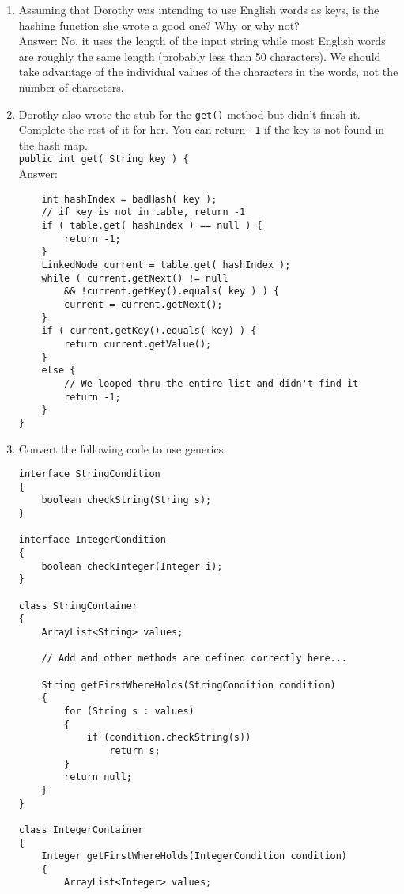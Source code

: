 \documentclass[11pt]{article}
\newenvironment{answer}{\large\lstset{basicstyle=\large\ttfamily}\color{white} \small{Answer:}}{}
\newenvironment{answer}{\large\lstset{basicstyle=\large\ttfamily}\color{red} \small{Answer:}}{}
\begin{document}
\begin{enumerate}
\item Assuming that Dorothy was intending to use English words as keys, is the hashing function she wrote a good one? Why or why not? \\
\begin{answer}
No, it uses the length of the input string while most English words are roughly the same length (probably less than 50 characters). We should take advantage of the individual values of the characters in the words, not the number of characters.  
\end{answer}



\item Dorothy also wrote the stub for the {\tt get()} method but didn't finish it. Complete the rest of it for her. You can return {\tt -1} if the key is not found in the hash map. \\
{\tt public int get( String key ) \{ } \\
\begin{answer} 
	\begin{lstlisting}
	int hashIndex = badHash( key );
	// if key is not in table, return -1
	if ( table.get( hashIndex ) == null ) {
		return -1;
	}
	LinkedNode current = table.get( hashIndex );
	while ( current.getNext() != null 
		&& !current.getKey().equals( key ) ) {
		current = current.getNext();
	}
	if ( current.getKey().equals( key) ) {
		return current.getValue();
	}
	else {
		// We looped thru the entire list and didn't find it
		return -1;
	}
}
	\end{lstlisting}
\end{answer}



\item Convert the following code to use generics.
\begin{lstlisting}
interface StringCondition
{
	boolean checkString(String s);
}

interface IntegerCondition
{
	boolean checkInteger(Integer i);
}

class StringContainer
{
	ArrayList<String> values;
	
	// Add and other methods are defined correctly here...

	String getFirstWhereHolds(StringCondition condition)
	{
		for (String s : values)
		{
			if (condition.checkString(s))
				return s;
		}
		return null;
	}
}

class IntegerContainer
{
	Integer getFirstWhereHolds(IntegerCondition condition)
	{
		ArrayList<Integer> values;


\end{lstlisting}
\end{enumerate}
\end{document}
